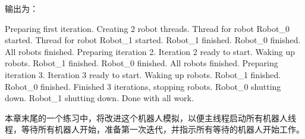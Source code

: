 输出为：

\begin{shell}
Preparing first iteration. Creating 2 robot threads.
    Thread for robot Robot_0 started.
    Thread for robot Robot_1 started.
    Robot_1 finished.
    Robot_0 finished.
All robots finished. Preparing iteration 2.
Iteration 2 ready to start. Waking up robots.
    Robot_1 finished.
    Robot_0 finished.
All robots finished. Preparing iteration 3.
Iteration 3 ready to start. Waking up robots.
    Robot_1 finished.
    Robot_0 finished.
Finished 3 iterations, stopping robots.
    Robot_0 shutting down.
    Robot_1 shutting down.
Done with all work.
\end{shell}

本章末尾的一个练习中，将改进这个机器人模拟，以便主线程启动所有机器人线程，等待所有机器人开始，准备第一次迭代，并指示所有等待的机器人开始工作。


















